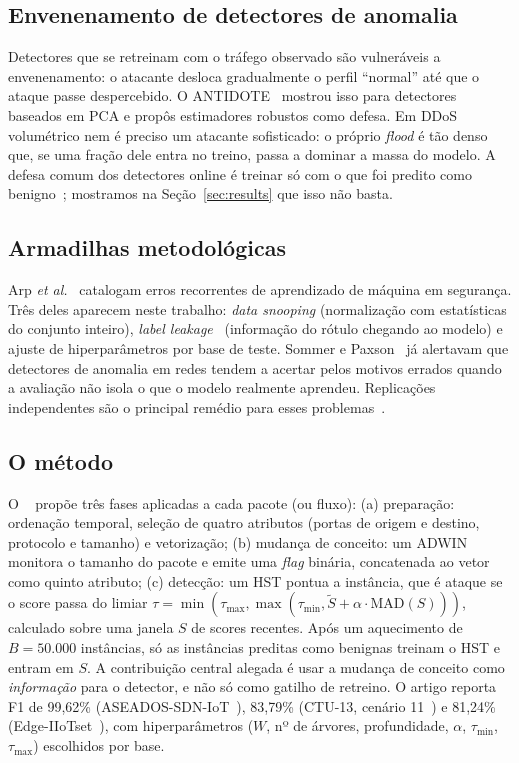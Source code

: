 \subsection{Envenenamento de detectores de anomalia}
Detectores que se retreinam com o tráfego observado são vulneráveis a envenenamento: o atacante
desloca gradualmente o perfil ``normal'' até que o ataque passe despercebido. O ANTIDOTE~\cite{rubinstein2009antidote}
mostrou isso para detectores baseados em PCA e propôs estimadores robustos como defesa. Em DDoS
volumétrico nem é preciso um atacante sofisticado: o próprio \emph{flood} é tão denso que, se
uma fração dele entra no treino, passa a dominar a massa do modelo. A defesa comum dos
detectores online é treinar só com o que foi predito como benigno~\cite{modus2026}; mostramos
na Seção~\ref{sec:results} que isso não basta.

\subsection{Armadilhas metodológicas}
Arp \emph{et al.}~\cite{arp2022dos} catalogam erros recorrentes de aprendizado de máquina em
segurança. Três deles aparecem neste trabalho: \emph{data snooping} (normalização com estatísticas
do conjunto inteiro), \emph{label leakage}~\cite{kaufman2012leakage} (informação do rótulo chegando
ao modelo) e ajuste de hiperparâmetros por base de teste. Sommer e Paxson~\cite{sommer2010outside}
já alertavam que detectores de anomalia em redes tendem a acertar pelos motivos errados quando a
avaliação não isola o que o modelo realmente aprendeu. Replicações independentes são o principal
remédio para esses problemas~\cite{baker2016reproducibility}.

\subsection{O método \modus}
O \modus~\cite{modus2026} propõe três fases aplicadas a cada pacote (ou fluxo):
(a) preparação: ordenação temporal, seleção de quatro atributos (portas de origem e destino,
protocolo e tamanho) e vetorização;
(b) mudança de conceito: um ADWIN monitora o tamanho do pacote e emite uma \emph{flag} binária,
concatenada ao vetor como quinto atributo;
(c) detecção: um HST pontua a instância, que é ataque se o score passa do limiar
$\tau = \min(\tau_{\max}, \max(\tau_{\min}, \tilde{S} + \alpha\cdot\mathrm{MAD}(S)))$, calculado
sobre uma janela $S$ de scores recentes. Após um aquecimento de $B=50.000$ instâncias, só as
instâncias preditas como benignas treinam o HST e entram em $S$. A contribuição central alegada é
usar a mudança de conceito como \emph{informação} para o detector, e não só como gatilho de
retreino. O artigo reporta F1 de 99,62\% (ASEADOS-SDN-IoT~\cite{aseados}), 83,79\%
(CTU-13, cenário 11~\cite{garcia2014ctu13}) e 81,24\% (Edge-IIoTset~\cite{ferrag2022edgeiiot}),
com hiperparâmetros ($W$, nº de árvores, profundidade, $\alpha$, $\tau_{\min}$, $\tau_{\max}$)
escolhidos por base.

